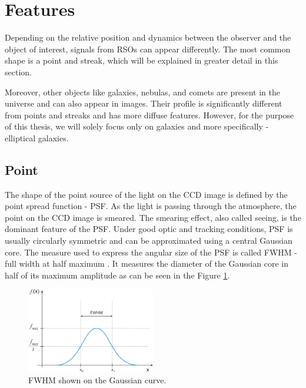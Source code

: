 \section{Features} \label{sec:features}
Depending on the relative position and dynamics between the observer
and the object of interest, signals from RSOs can appear differently. The most common shape is a point and streak, which will be explained in greater detail in this section. 

Moreover, other objects like galaxies, nebulas, and comets are present in the universe and can also appear in images. Their profile is significantly different from points and streaks and has more diffuse features. However, for the purpose of this thesis, we will solely focus only on galaxies and more specifically - elliptical galaxies. 

\subsection{Point}

The shape of the point source of the light on the CCD image is defined by the point spread function - PSF. As the light is passing through the atmosphere, the point on the CCD image is smeared. The smearing effect, also called seeing, is the dominant feature of the PSF. 
Under good optic and tracking conditions, PSF is usually circularly symmetric and can be approximated using a central Gaussian core. The measure used to express the angular size of the PSF is called FWHM - full width at half maximum \cite{romanishin2006introduction}. It measures the diameter of the Gaussian core in half of its maximum amplitude as can be seen in the Figure \ref{img:fwhm0}.  

\begin{figure}[h]
    \centering
    \includegraphics[width=0.5\textwidth]{images/fwhm.png}
    \caption{FWHM shown on the Gaussian curve. }
    \label{img:fwhm0}
\end{figure}

